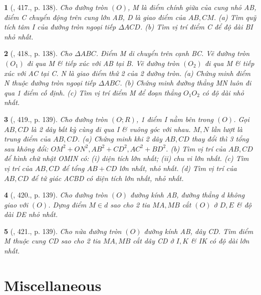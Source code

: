 \documentclass{article}
\newtheorem{baitoan}{}
\begin{document}
\begin{baitoan}[\cite{Binh_Toan_9_tap_2}, 417., p. 138]
	Cho đường tròn $(O)$, M là điểm chính giữa của cung nhỏ AB, điểm C chuyển động trên cung lớn AB, D là giao điểm của $AB,CM$. (a) Tìm quỹ tích tâm I của đường tròn ngoại tiếp $\Delta ACD$. (b) Tìm vị trí điểm C để độ dài BI nhỏ nhất.
\end{baitoan}

\begin{baitoan}[\cite{Binh_Toan_9_tap_2}, 418., p. 138]
	Cho $\Delta ABC$. Điểm M di chuyển trên cạnh BC. Vẽ đường tròn $(O_1)$ đi qua M \& tiếp xúc với AB tại B. Vẽ đường tròn $(O_2)$ đi qua M \& tiếp xúc với AC tại C. N là giao điểm thứ 2 của 2 đường tròn. (a) Chứng minh điểm N thuộc đường tròn ngoại tiếp $\Delta ABC$. (b) Chứng minh đường thẳng MN luôn đi qua 1 điểm cố định. (c) Tìm vị trí điểm M để đoạn thẳng $O_1O_2$ có độ dài nhỏ nhất.
\end{baitoan}

\begin{baitoan}[\cite{Binh_Toan_9_tap_2}, 419., p. 139]
	Cho đường tròn $(O;R)$, 1 điểm I nằm bên trong $(O)$. Gọi $AB,CD$ là 2 dây bất kỳ cùng đi qua I \& vuông góc với nhau. $M,N$ lần lượt là trung điểm của $AB,CD$. (a) Chứng minh khi 2 dây $AB,CD$ thay đổi thì 3 tổng sau không đổi: $OM^2 + ON^2,AB^2 + CD^2,AC^2 + BD^2$. (b) Tìm vị trí của $AB,CD$ để hình chữ nhật OMIN có: (i) diện tích lớn nhất; (ii) chu vi lớn nhất. (c) Tìm vị trí của $AB,CD$ để tổng $AB + CD$ lớn nhất, nhỏ nhất. (d) Tìm vị trí của $AB,CD$ để tứ giác ACBD có diện tích lớn nhất, nhỏ nhất.
\end{baitoan}

\begin{baitoan}[\cite{Binh_Toan_9_tap_2}, 420., p. 139]
	Cho đường tròn $(O)$ đường kính AB, đường thẳng d không giao với $(O)$. Dựng điểm $M\in d$ sao cho 2 tia $MA,MB$ cắt $(O)$ ở $D,E$ \& độ dài DE nhỏ nhất.
\end{baitoan}

\begin{baitoan}[\cite{Binh_Toan_9_tap_2}, 421., p. 139]
	Cho nửa đường tròn $(O)$ đường kính AB, dây CD. Tìm điểm M thuộc cung CD sao cho 2 tia $MA,MB$ cắt dây CD ở $I,K$ \& IK có độ dài lớn nhất.
\end{baitoan}


\section{Miscellaneous}
\end{document}
